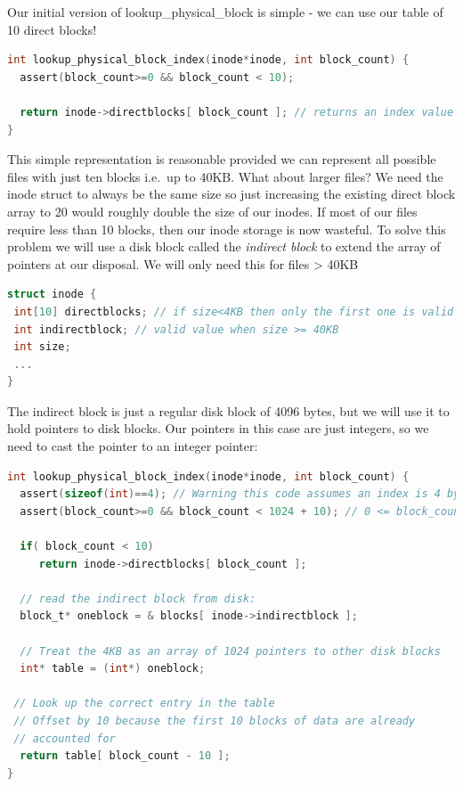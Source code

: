 Our initial version of lookup\_physical\_block is simple - we can use our table of 10 direct blocks!

\begin{lstlisting}[language=C]
int lookup_physical_block_index(inode*inode, int block_count) {
  assert(block_count>=0 && block_count < 10);

  return inode->directblocks[ block_count ]; // returns an index value between [0,MAX_BLOCK)
}
\end{lstlisting}

This simple representation is reasonable provided we can represent all possible files with just ten blocks i.e.~up to 40KB. What about larger files? We need the inode struct to always be the same size so just increasing the existing direct block array to 20 would roughly double the size of our inodes. If most of our files require less than 10 blocks, then our inode storage is now wasteful. To solve this problem we will use a disk block called the \emph{indirect block} to extend the array of pointers at our disposal. We will only need this for files \textgreater{} 40KB

\begin{lstlisting}[language=C]
struct inode {
 int[10] directblocks; // if size<4KB then only the first one is valid
 int indirectblock; // valid value when size >= 40KB
 int size;
 ...
}
\end{lstlisting}

The indirect block is just a regular disk block of 4096 bytes, but we will use it to hold pointers to disk blocks. Our pointers in this case are just integers, so we need to cast the pointer to an integer pointer:

\begin{lstlisting}[language=C]
int lookup_physical_block_index(inode*inode, int block_count) {
  assert(sizeof(int)==4); // Warning this code assumes an index is 4 bytes!
  assert(block_count>=0 && block_count < 1024 + 10); // 0 <= block_count< 1034

  if( block_count < 10)
     return inode->directblocks[ block_count ];

  // read the indirect block from disk:
  block_t* oneblock = & blocks[ inode->indirectblock ];

  // Treat the 4KB as an array of 1024 pointers to other disk blocks
  int* table = (int*) oneblock;

 // Look up the correct entry in the table
 // Offset by 10 because the first 10 blocks of data are already
 // accounted for
  return table[ block_count - 10 ];
}
\end{lstlisting}

